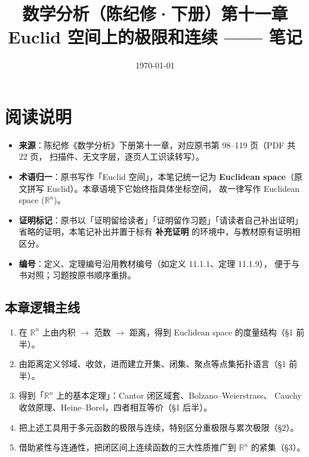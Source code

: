\documentclass[11pt]{ctexart}
\title{数学分析（陈纪修·下册）第十一章\\[2pt]
\large Euclid 空间上的极限和连续 —— 笔记}
\author{}
\date{\today}
\theoremstyle{plain}
\theoremstyle{definition}
\theoremstyle{remark}
\begin{document}
\maketitle
\tableofcontents
\newpage

\section*{阅读说明}

\begin{itemize}
  \item \textbf{来源}：陈纪修《数学分析》下册第十一章，对应原书第 98--119 页（PDF 共 22 页，
        扫描件、无文字层，逐页人工识读转写）。
  \item \textbf{术语归一}：原书写作「Euclid 空间」，本笔记统一记为
        \textbf{Euclidean space}（原文拼写 Euclid）。本章语境下它始终指具体坐标空间，
        故一律写作 Euclidean space (\(\mathbb{R}^n\))。
  \item \textbf{证明标记}：原书以「证明留给读者」「证明留作习题」「请读者自己补出证明」
        省略的证明，本笔记补出并置于标有 \textbf{补充证明} 的环境中，与教材原有证明相区分。
  \item \textbf{编号}：定义、定理编号沿用教材编号（如定义 11.1.1、定理 11.1.9），
        便于与书对照；习题按原书顺序重排。
\end{itemize}

\subsection*{本章逻辑主线}
\begin{enumerate}
  \item 在 \(\mathbb{R}^n\) 上由内积 \(\to\) 范数 \(\to\) 距离，得到 Euclidean space 的度量结构（\S 1 前半）。
  \item 由距离定义邻域、收敛，进而建立开集、闭集、聚点等点集拓扑语言（\S 1 前半）。
  \item 得到「\(\mathbb{R}^n\) 上的基本定理」：Cantor 闭区域套、Bolzano--Weierstrass、
        Cauchy 收敛原理、Heine--Borel，四者相互等价（\S 1 后半）。
  \item 把上述工具用于多元函数的极限与连续，特别区分重极限与累次极限（\S 2）。
  \item 借助紧性与连通性，把闭区间上连续函数的三大性质推广到 \(\mathbb{R}^n\) 的紧集（\S 3）。
\end{enumerate}

\newpage

\end{document}
